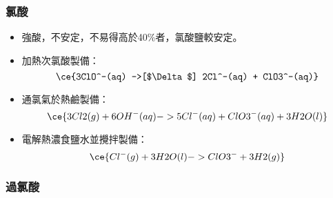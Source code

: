 \documentclass[a4paper,12pt]{report}
\begin{document}
\subsubsection{氯酸}
\begin{itemize}
\item 強酸，不安定，不易得高於40\%者，氯酸鹽較安定。
\item 加熱次氯酸製備：
\[\ce{3ClO^-(aq) ->[$\Delta$] 2Cl^-(aq) + ClO3^-(aq)}\]
\item 通氯氣於熱鹼製備：
\[\ce{3Cl2(g) + 6OH^-(aq) -> 5Cl^-(aq) + ClO3^-(aq) + 3H2O(l)}\]
\item 電解熱濃食鹽水並攪拌製備：
\[\ce{Cl^-(g) + 3H2O(l) -> ClO3^- + 3H2(g)}\]
\end{itemize}
\subsubsection{過氯酸}
\end{document}
